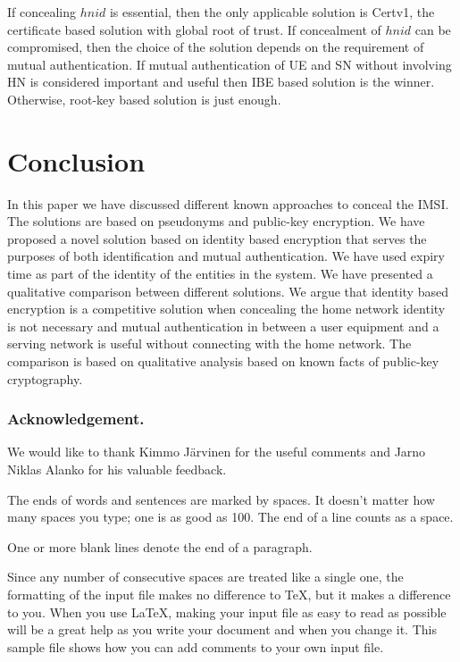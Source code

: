 \documentclass{river-journal}
\begin{document}
If concealing $hnid$ is essential, then the only applicable solution is Certv1, the certificate based solution with global root of trust. If concealment of $hnid$ can be compromised, then the choice  of the solution depends on the requirement of mutual authentication. If mutual authentication of UE and SN without involving HN is considered important and useful then IBE based solution is the winner. Otherwise, root-key based solution is just enough.


\section{Conclusion}
\label{sec:conclusion}In this paper we have discussed different known approaches to conceal the IMSI. The solutions  are based on pseudonyms and public-key encryption. We have proposed a novel solution based on identity based encryption that serves the purposes of both identification and mutual authentication. We have used expiry time as part of the identity of the entities in the system. We have presented a qualitative comparison between different  solutions. We argue that identity based encryption is a competitive solution when concealing the home network identity is not necessary and mutual authentication in between a user equipment and a serving network is useful without connecting with the home network. The comparison is based on qualitative analysis based on known facts of public-key cryptography.



\subsubsection{Acknowledgement.}
\label{sec:acknowledgement}
We would like to thank Kimmo J\"arvinen for the useful comments and Jarno Niklas Alanko for his valuable feedback.

The ends  of words and sentences are marked
  by   spaces. It  doesn't matter how many
spaces    you type; one is as good as 100.  The
end of   a line counts as a space.

One   or more   blank lines denote the  end
of  a paragraph.

Since any number of consecutive spaces are treated like a single
one, the formatting of the input file makes no difference to
      \TeX,         %
but it makes a difference to you.
When you use
      \LaTeX,       %
making your input file as easy to read as possible
will be a great help as you write your document and when you
change it.  This sample file shows how you can add comments to
your own input file.
\end{document}
